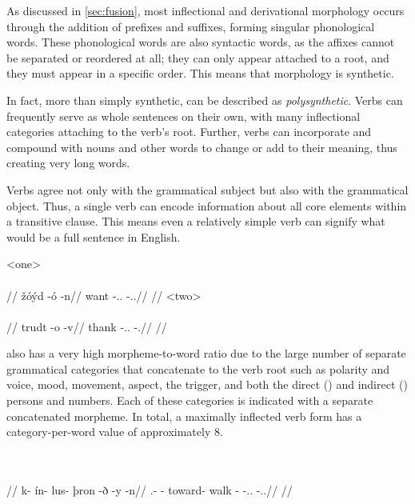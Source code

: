 As discussed in \autoref{sec:fusion}, most inflectional and derivational morphology occurs through the addition of prefixes and suffixes, forming singular phonological words. These phonological words are also syntactic words, as the affixes cannot be separated or reordered at all; they can only appear attached to a root, and they must appear in a specific order. This means that \lang{} morphology is synthetic\autocite{wals-22}.

In fact, more than simply synthetic, \lang{} can be described as \emph{polysynthetic}. Verbs can frequently serve as whole sentences on their own, with many inflectional categories attaching to the verb's root. Further, verbs can incorporate and compound with nouns and other words to change or add to their meaning, thus creating very long words.

Verbs agree not only with the grammatical subject but also with the grammatical object. Thus, a single verb can encode information about all core elements within a transitive clause. This means even a relatively simple verb can signify what would be a full sentence in English.

	\a<one>\begingl
		\glpreamble{}\\
		\\
		//
		\gla žóýd -ó -n//
		\glb want -\At.\Dir.\Fpi{} -\Idr.\Tps.\Prox//
		\glft {}//
	\endgl
	\a<two>\begingl
		\glpreamble{}\\
		\\
		//
		\gla trudt -o -v//
		\glb thank -\At.\Dir.\Fps{} -\Idr.\Spp//
		\glft {}//
	\endgl
\xe

\lang{} also has a very high morpheme-to-word ratio due to the large number of separate grammatical categories that concatenate to the verb root such as polarity and voice, mood, movement, aspect, the trigger, and both the direct (\Dir) and indirect (\Ind) persons and numbers. Each of these categories is indicated with a separate concatenated morpheme. In total, a maximally inflected verb form has a category-per-word value of approximately 8\autocite{wals-22}.

	\begingl
		\glpreamble{}\\
		\\
		//
		\gla k- ín- lus- þron -ð -y -n//
		\glb \Neg.\Act- \Cond- toward- walk -\Dur{} -\Pt.\Dir.\Sps{} -\Ind.\Tps.\Prox//
		\glft {}//
	\endgl
\xe


